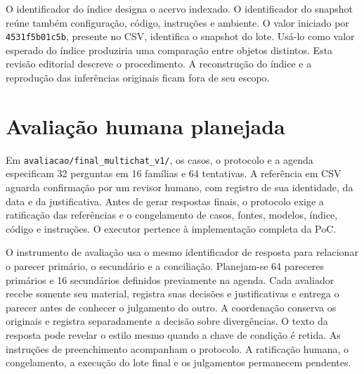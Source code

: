 O identificador do índice designa o acervo indexado. O identificador do snapshot reúne também configuração, código, instruções e ambiente. O valor iniciado por \texttt{4531f5b01c5b}, presente no CSV, identifica o snapshot do lote. Usá-lo como valor esperado do índice produziria uma comparação entre objetos distintos. Esta revisão editorial descreve o procedimento. A reconstrução do índice e a reprodução das inferências originais ficam fora de seu escopo.

\section{Avaliação humana planejada}

Em \nolinkurl{avaliacao/final_multichat_v1/}, os casos, o protocolo e a agenda especificam 32 perguntas em 16 famílias e 64 tentativas. A referência em CSV aguarda confirmação por um revisor humano, com registro de sua identidade, da data e da justificativa. Antes de gerar respostas finais, o protocolo exige a ratificação das referências e o congelamento de casos, fontes, modelos, índice, código e instruções. O executor pertence à implementação completa da PoC.

O instrumento de avaliação usa o mesmo identificador de resposta para relacionar o parecer primário, o secundário e a conciliação. Planejam-se 64 pareceres primários e 16 secundários definidos previamente na agenda. Cada avaliador recebe somente seu material, registra suas decisões e justificativas e entrega o parecer antes de conhecer o julgamento do outro. A coordenação conserva os originais e registra separadamente a decisão sobre divergências. O texto da resposta pode revelar o estilo mesmo quando a chave de condição é retida. As instruções de preenchimento acompanham o protocolo. A ratificação humana, o congelamento, a execução do lote final e os julgamentos permanecem pendentes.
